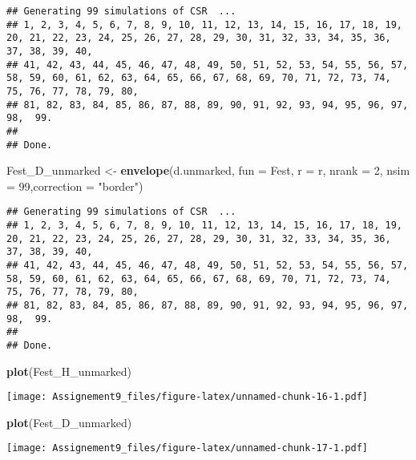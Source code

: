 \documentclass[]{article}
\newenvironment{Shaded}{\begin{snugshade}}{\end{snugshade}}
\newcommand{\DataTypeTok}[1]{\textcolor[rgb]{0.13,0.29,0.53}{#1}}
\newcommand{\DecValTok}[1]{\textcolor[rgb]{0.00,0.00,0.81}{#1}}
\newcommand{\KeywordTok}[1]{\textcolor[rgb]{0.13,0.29,0.53}{\textbf{#1}}}
\newcommand{\NormalTok}[1]{#1}
\newcommand{\StringTok}[1]{\textcolor[rgb]{0.31,0.60,0.02}{#1}}
\begin{document}
\begin{verbatim}
## Generating 99 simulations of CSR  ...
## 1, 2, 3, 4, 5, 6, 7, 8, 9, 10, 11, 12, 13, 14, 15, 16, 17, 18, 19, 20, 21, 22, 23, 24, 25, 26, 27, 28, 29, 30, 31, 32, 33, 34, 35, 36, 37, 38, 39, 40,
## 41, 42, 43, 44, 45, 46, 47, 48, 49, 50, 51, 52, 53, 54, 55, 56, 57, 58, 59, 60, 61, 62, 63, 64, 65, 66, 67, 68, 69, 70, 71, 72, 73, 74, 75, 76, 77, 78, 79, 80,
## 81, 82, 83, 84, 85, 86, 87, 88, 89, 90, 91, 92, 93, 94, 95, 96, 97, 98,  99.
## 
## Done.
\end{verbatim}

\begin{Shaded}
\begin{Highlighting}[]
\NormalTok{Fest_D_unmarked <-}\StringTok{ }\KeywordTok{envelope}\NormalTok{(d.unmarked, }\DataTypeTok{fun =}\NormalTok{ Fest, }\DataTypeTok{r =}\NormalTok{ r, }\DataTypeTok{nrank =} \DecValTok{2}\NormalTok{, }\DataTypeTok{nsim =} \DecValTok{99}\NormalTok{,}\DataTypeTok{correction =} \StringTok{"border"}\NormalTok{)}
\end{Highlighting}
\end{Shaded}

\begin{verbatim}
## Generating 99 simulations of CSR  ...
## 1, 2, 3, 4, 5, 6, 7, 8, 9, 10, 11, 12, 13, 14, 15, 16, 17, 18, 19, 20, 21, 22, 23, 24, 25, 26, 27, 28, 29, 30, 31, 32, 33, 34, 35, 36, 37, 38, 39, 40,
## 41, 42, 43, 44, 45, 46, 47, 48, 49, 50, 51, 52, 53, 54, 55, 56, 57, 58, 59, 60, 61, 62, 63, 64, 65, 66, 67, 68, 69, 70, 71, 72, 73, 74, 75, 76, 77, 78, 79, 80,
## 81, 82, 83, 84, 85, 86, 87, 88, 89, 90, 91, 92, 93, 94, 95, 96, 97, 98,  99.
## 
## Done.
\end{verbatim}

\begin{Shaded}
\begin{Highlighting}[]
\KeywordTok{plot}\NormalTok{(Fest_H_unmarked)}
\end{Highlighting}
\end{Shaded}

\texttt{[image: Assignement9\_files/figure-latex/unnamed-chunk-16-1.pdf]}

\begin{Shaded}
\begin{Highlighting}[]
\KeywordTok{plot}\NormalTok{(Fest_D_unmarked)}
\end{Highlighting}
\end{Shaded}

\texttt{[image: Assignement9\_files/figure-latex/unnamed-chunk-17-1.pdf]}
\end{document}
